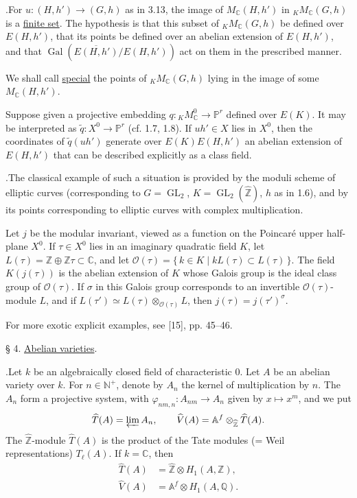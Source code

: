 \documentclass[10pt]{article}
\newcommand{\Af}{\mathbb A^f}
\newcommand{\C}{\mathbb C}
\newcommand{\Q}{\mathbb Q}
\newcommand{\Z}{\mathbb Z}
\newcommand{\GL}{\operatorname{GL}}
\newcommand{\Gal}{\operatorname{Gal}}
\begin{document}
.\quad For $u:(H,h')\longrightarrow(G,h)$ as in 3.13, the image of $M_{\C}(H,h')$ in ${}_K M_{\C}(G,h)$ is a \uline{finite set}. The hypothesis is that this subset of ${}_K M_{\C}(G,h)$ be defined over $E(H,h')$, that its points be defined over an abelian extension of $E(H,h')$, and that $\Gal(\overline{E(H,h')}/E(H,h'))$ act on them in the prescribed manner.

We shall call \textquotedbl{}\uline{special}\textquotedbl{} the points of ${}_K M_{\C}(G,h)$ lying in the image of some $M_{\C}(H,h')$.

Suppose given a projective embedding $q:{}_K M_{\C}^{0}\longrightarrow \mathbb P^r$ defined over $E(K)$. It may be interpreted as $\widetilde q:X^0\longrightarrow \mathbb P^r$ (cf. 1.7, 1.8). If $uh'\in X$ lies in $X^0$, then the coordinates of $\widetilde q(uh')$ generate over $E(K)E(H,h')$ an abelian extension of $E(H,h')$ that can be described explicitly as a class field.

.\quad The classical example of such a situation is provided by the moduli scheme of elliptic curves (corresponding to $G=\GL_2$, $K=\GL_2(\widehat{\Z})$, $h$ as in 1.6), and by its points corresponding to elliptic curves with complex multiplication.

Let $j$ be the modular invariant, viewed as a function on the Poincaré upper half-plane $X^0$. If $\tau\in X^0$ lies in an imaginary quadratic field $K$, let $L(\tau)=\Z\oplus \Z\tau\subset\C$, and let $\mathcal O(\tau)=\{\,k\in K\mid kL(\tau)\subset L(\tau)\,\}$. The field $K(j(\tau))$ is the abelian extension of $K$ whose Galois group is the ideal class group of $\mathcal O(\tau)$. If $\sigma$ in this Galois group corresponds to an invertible $\mathcal O(\tau)$-module $L$, and if $L(\tau')\simeq L(\tau)\otimes_{\mathcal O(\tau)}L$, then $j(\tau)=j(\tau')^\sigma$.

For more exotic explicit examples, see [15], pp. 45--46.


\par\vspace{1.1em}
\noindent § 4. \uline{Abelian varieties}.\par\vspace{0.9em}

.\quad Let $k$ be an algebraically closed field of characteristic $0$. Let $A$ be an abelian variety over $k$. For $n\in\mathbb N^+$, denote by $A_n$ the kernel of multiplication by $n$. The $A_n$ form a projective system, with $\varphi_{nm,n}:A_{nm}\longrightarrow A_n$ given by $x\longmapsto x^m$,
and we put
\[
\widehat T(A)=\varprojlim A_n,\qquad
\widehat V(A)=\Af\otimes_{\widehat{\Z}}\widehat T(A).
\]
The $\widehat{\Z}$-module $\widehat T(A)$ is the product of the Tate modules (= Weil representations) $T_\ell(A)$. If $k=\C$, then
\begingroup
\makeatletter
\tagsleft@true
\makeatother
\begin{align}
\widehat T(A)&=\widehat{\Z}\otimes H_1(A,\Z),\tag{4.1.1}\\
\widehat V(A)&=\Af\otimes H_1(A,\Q).\tag{4.1.2}
\end{align}
\endgroup
\end{document}
